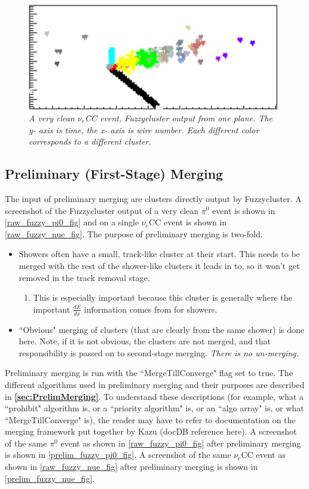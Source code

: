\documentclass{article}
\begin{document}
\begin{figure}[h!]
\begin{center}
\includegraphics[width=110mm]{Figures/raw_fuzzy_nue.png}
\end{center}
\caption{\textit{A very clean $\nu_e$CC event, Fuzzycluster output from one plane. The y- axis is time, the x- axis is wire number. Each different color corresponds to a different cluster.}}
\label{raw_fuzzy_nue_fig}
\end{figure}

\subsection{Preliminary (First-Stage) Merging}
The input of preliminary merging are clusters directly output by Fuzzycluster. A screenshot of the Fuzzycluster output of a very clean $\pi^0$ event is shown in \autoref{raw_fuzzy_pi0_fig} and on a single $\nu_e$CC event is shown in \autoref{raw_fuzzy_nue_fig}. The purpose of preliminary merging is two-fold.
\begin{itemize}
\item Showers often have a small, track-like cluster at their start. This needs to be merged with the rest of the shower-like clusters it leads in to, so it won't get removed in the track removal stage.
	\begin{enumerate}
	\item This is especially important because this cluster is generally where the important $\frac{dE}{dx}$ information comes from for showers.
	\end{enumerate}
\item ``Obvious" merging of clusters (that are clearly from the same shower) is done here. Note, if it is not obvious, the clusters are not merged, and that responsibility is passed on to second-stage merging. \textit{There is no un-merging.}
\end{itemize}
Preliminary merging is run with the ``MergeTillConverge" flag set to true. The different algorithms used in preliminary merging and their purposes are described in \textbf{\autoref{sec:PrelimMerging}}. To understand these descriptions (for example, what a ``prohibit" algorithm is, or a ``priority algorithm" is, or an ``algo array" is, or what ``MergeTillConverge" is), the reader may have to refer to documentation on the merging framework put together by Kazu (docDB reference here). A screenshot of the same $\pi^0$ event as shown in \autoref{raw_fuzzy_pi0_fig} after preliminary merging is shown in \autoref{prelim_fuzzy_pi0_fig}. A screenshot of the same $\nu_e$CC event as shown in \autoref{raw_fuzzy_nue_fig} after preliminary merging is shown in \autoref{prelim_fuzzy_nue_fig}.
\end{document}
